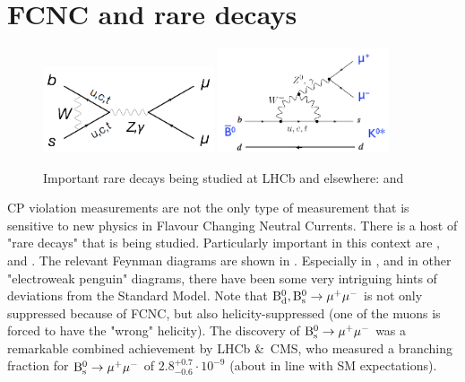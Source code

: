 \section{FCNC and rare decays}

\begin{figure}
    \centering
    \includegraphics[width=0.45\textwidth]{fig/RareBs2MuMu}
    \includegraphics[width=0.45\textwidth]{fig/RareKstarMuMu}
    \caption{Important rare decays being studied at LHCb and elsewhere:  and \label{fig:RareDecays}}
\end{figure}
CP violation measurements are not the only type of measurement that is sensitive to new physics in Flavour Changing Neutral Currents. There is a host of "rare decays" that is being studied. Particularly important in this context are \prt{\Bdo \to \mu^+ \mu^-},  and . The relevant Feynman diagrams are shown in . Especially in , and in other "electroweak penguin" diagrams, there have been some very intriguing hints of deviations from the Standard Model. Note that ${\rm B_{d}^0}, {\rm B_{s}^0} \to \mu^+ \mu^-$ is not only suppressed because of FCNC, but also helicity-suppressed (one of the muons is forced to have the "wrong" helicity). The discovery of ${\rm B_{s}^0} \to \mu^+ \mu^-$ was a remarkable combined achievement by LHCb \&\ CMS, who measured a branching fraction for ${\rm B_{s}^0} \to \mu^+ \mu^-$ of $2.8^{+0.7}_{-0.6} \cdot 10^{-9}$ (about in line with SM expectations).


